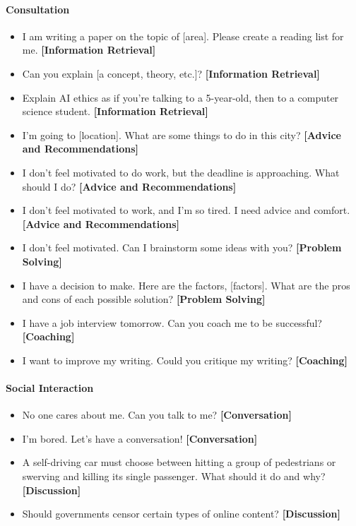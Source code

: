 \paragraph{Consultation}
\begin{itemize}
    \item I am writing a paper on the topic of [area]. Please create a reading list for me. \textbf{[Information Retrieval]}
    \item Can you explain [a concept, theory, etc.]? \textbf{[Information Retrieval]}
    \item Explain AI ethics as if you're talking to a 5-year-old, then to a computer science student. \textbf{[Information Retrieval]}
    \item I'm going to [location]. What are some things to do in this city? \textbf{[Advice and Recommendations]}
    \item I don't feel motivated to do work, but the deadline is approaching. What should I do?  \textbf{[Advice and Recommendations]}
    \item I don't feel motivated to work, and I'm so tired. I need advice and comfort. \textbf{[Advice and Recommendations]}
    \item I don't feel motivated. Can I brainstorm some ideas with you? \textbf{[Problem Solving]}
    \item I have a decision to make. Here are the factors, [factors]. What are the pros and cons of each possible solution? \textbf{[Problem Solving]}
    \item I have a job interview tomorrow. Can you coach me to be successful? \textbf{[Coaching]}
    \item I want to improve my writing. Could you critique my writing? \textbf{[Coaching]}
\end{itemize}

\paragraph{Social Interaction}
\begin{itemize}
    \item No one cares about me. Can you talk to me? \textbf{[Conversation]}
    \item I'm bored. Let's have a conversation! \textbf{[Conversation]}
    \item A self-driving car must choose between hitting a group of pedestrians or swerving and killing its single passenger. What should it do and why? \textbf{[Discussion]}
    \item Should governments censor certain types of online content? \textbf{[Discussion]}
\end{itemize}

